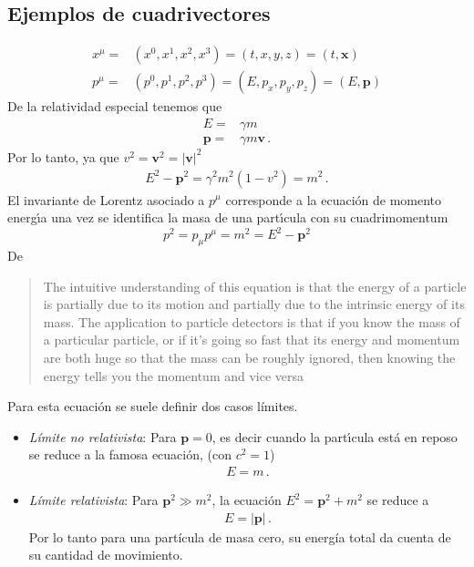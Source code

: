 \subsection{Ejemplos de cuadrivectores}
\begin{align}
    x^\mu=&(x^0,x^1,x^2,x^3)=(t,x,y,z)=(t,\mathbf{x})\\
  p^\mu=&(p^0,p^1,p^2,p^3)=(E,p_x,p_y,p_z)=(E,\mathbf{p})
\end{align}
De la relatividad especial tenemos que
\begin{align}
  E=&\gamma m \nonumber\\
  \mathbf{p}=&\gamma m\mathbf{v}\,.
\end{align}
Por lo tanto, ya que $v^2=\mathbf{v}^2=|\mathbf{v}|^2$
\begin{align}
  E^2-\mathbf{p}^2=\gamma^2m^2(1-v^2)=m^2\,.
\end{align}
El invariante de Lorentz asociado a $p^\mu$ corresponde a la ecuaci\'on de momento energ\'\i a una vez se identifica la masa de una part\'\i cula con su cuadrimomentum
\begin{equation}
  p^2=p_\mu p^\mu=m^2=E^2-\mathbf{p}^2
\end{equation}
De \cite{uslhcblog}
\begin{quote}
  The intuitive understanding of this equation is that the energy of a particle is partially due to its motion and partially due to the intrinsic energy of its mass.  The application to particle detectors is that if you know the mass of a particular particle, or if it’s going so fast that its energy and momentum are both huge so that the mass can be roughly ignored, then knowing the energy tells you the momentum and vice versa
\end{quote}

Para esta ecuación se suele definir dos casos límites.
\begin{itemize}
\item \emph{Límite no relativista}: Para $\mathbf{p}=0$, es decir cuando la part\'\i cula est\'a en reposo se reduce a la famosa ecuaci\'on, (con $c^2=1$)
  \begin{align}
    E=m\,.
  \end{align}

\item \emph{Límite relativista}: Para $\mathbf{p}^2\gg m^2$, la ecuación $E^2=\mathbf{p}^2+m^2$ se reduce a
  \begin{align}
    E= |\mathbf{p}|\,.
  \end{align}
Por lo tanto para una partícula de masa cero, su energía total da cuenta de su cantidad de movimiento.
\end{itemize}



